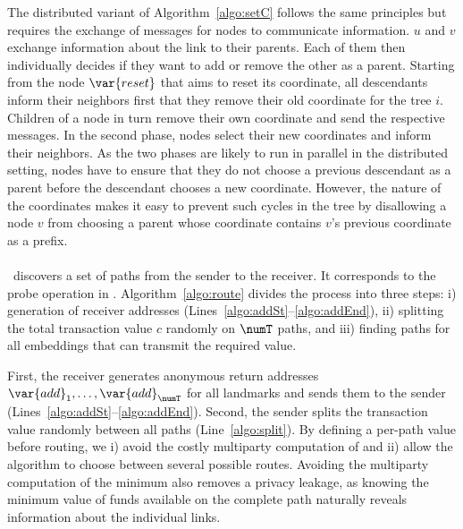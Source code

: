 The distributed variant of Algorithm~\ref{algo:setC} follows the same principles but requires the exchange of messages for nodes to communicate information. $u$ and $v$ exchange information about the link to their parents. Each of them then individually decides if they want to add or remove the other as a parent. 
Starting from the node $\var{reset}$ that aims to reset its coordinate, all descendants inform their neighbors first that they remove their old coordinate for the tree $i$. Children of a node in turn remove their own coordinate and send the respective messages. In the second phase, nodes select their new coordinates and inform their neighbors. 
As the two phases are likely to run in parallel in the distributed setting, nodes have to ensure that they do not choose a previous descendant as a parent before the descendant chooses a new coordinate. However, the nature of the coordinates makes it easy to prevent such cycles in the tree by disallowing a node $v$ from choosing a parent whose coordinate contains $v$'s previous coordinate as a prefix. 

\paragraph*{\routePay}
\routePay\ discovers a set of paths from the sender to the receiver. It corresponds to the probe operation in \cnsysname. Algorithm~\ref{algo:route} divides the process into three steps: i) generation of receiver addresses (Lines~\ref{algo:addSt}--\ref{algo:addEnd}), ii) splitting the total transaction value $c$ randomly on $\numT$ paths, and iii) finding paths for all embeddings that can transmit the required value. 

First, the receiver generates anonymous return addresses $\var{add}_1, \ldots , \var{add}_{\numT}$ for all landmarks and sends them to the sender (Lines~\ref{algo:addSt}--\ref{algo:addEnd}).
Second, the sender splits the transaction value randomly between all paths (Line~\ref{algo:split}). By defining a per-path value before routing, we i) avoid the costly multiparty computation of \cnsysname and ii) allow the algorithm to choose between several possible routes. Avoiding the multiparty computation of the minimum also removes a privacy leakage, as knowing the minimum value of funds available on the complete path naturally reveals information about the individual links.  

